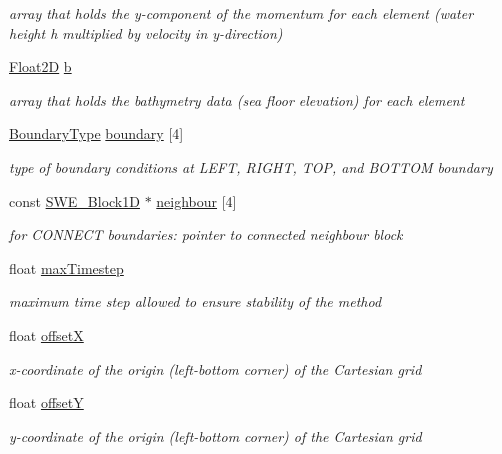 \begin{DoxyCompactItemize}
\begin{DoxyCompactList}\small\item\em array that holds the y-\/component of the momentum for each element (water height h multiplied by velocity in y-\/direction) \end{DoxyCompactList}\item 
\hyperlink{classFloat2D}{Float2D} \hyperlink{classSWE__Block_af7487209129f40b26ea171762754a261}{b}
\begin{DoxyCompactList}\small\item\em array that holds the bathymetry data (sea floor elevation) for each element \end{DoxyCompactList}\item 
\hyperlink{scenarios_2SWE__Scenario_8hh_af75d5dd7322fa39ed0af4e7839e600f8}{Boundary\+Type} \hyperlink{classSWE__Block_a0e56d0cad169abd4f5de95d9f96c7a73}{boundary} \mbox{[}4\mbox{]}
\begin{DoxyCompactList}\small\item\em type of boundary conditions at L\+E\+FT, R\+I\+G\+HT, T\+OP, and B\+O\+T\+T\+OM boundary \end{DoxyCompactList}\item 
const \hyperlink{structSWE__Block1D}{S\+W\+E\+\_\+\+Block1D} $\ast$ \hyperlink{classSWE__Block_a5ea4ea4815af9eb66c51de9ad9b8d148}{neighbour} \mbox{[}4\mbox{]}
\begin{DoxyCompactList}\small\item\em for C\+O\+N\+N\+E\+CT boundaries\+: pointer to connected neighbour block \end{DoxyCompactList}\item 
float \hyperlink{classSWE__Block_a05cbc9b40e0483bf73dbc2bdeae7dee3}{max\+Timestep}
\begin{DoxyCompactList}\small\item\em maximum time step allowed to ensure stability of the method \end{DoxyCompactList}\item 
float \hyperlink{classSWE__Block_aa9e9b1fa797c133c4989e4c54f09b542}{offsetX}
\begin{DoxyCompactList}\small\item\em x-\/coordinate of the origin (left-\/bottom corner) of the Cartesian grid \end{DoxyCompactList}\item 
float \hyperlink{classSWE__Block_aa05241101a66f0f0548eba6dbbaa1bbb}{offsetY}
\begin{DoxyCompactList}\small\item\em y-\/coordinate of the origin (left-\/bottom corner) of the Cartesian grid \end{DoxyCompactList}\end{DoxyCompactItemize}


